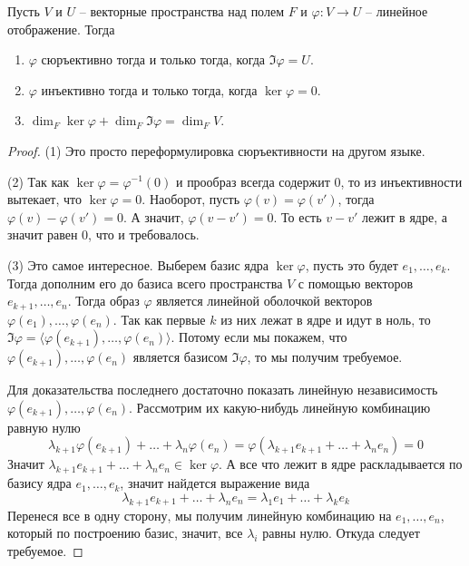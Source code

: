 \begin{claim}
\label{claim::ImKer}
Пусть $V$ и $U$ -- векторные пространства над полем $F$ и $\varphi \colon V\to U$ -- линейное отображение.
Тогда
\begin{enumerate}
\item $\varphi$ сюръективно тогда и только тогда, когда $\Im \varphi = U$.

\item $\varphi$ инъективно тогда и только тогда, когда $\ker \varphi = 0$.

\item $\dim_F \ker \varphi + \dim_F \Im \varphi = \dim_F V$.
\end{enumerate}
\end{claim}
\begin{proof}
(1) Это просто переформулировка сюръективности на другом языке.

(2) Так как $\ker \varphi = \varphi^{-1}(0)$ и прообраз всегда содержит $0$, то из инъективности вытекает, что $\ker \varphi = 0$.
Наоборот, пусть $\varphi (v) = \varphi(v')$, тогда $\varphi(v) - \varphi (v') = 0$.
А значит,  $\varphi(v - v') = 0$.
То есть $v - v'$ лежит в ядре, а значит равен $0$, что и требовалось.

(3) Это самое интересное.
Выберем базис ядра $\ker \varphi$, пусть это будет $e_1,\ldots, e_k$.
Тогда дополним его до базиса всего пространства $V$ с помощью векторов $e_{k+1}, \ldots, e_n$.
Тогда образ $\varphi$ является линейной оболочкой векторов $\varphi(e_1),\ldots, \varphi(e_n)$.
Так как первые $k$ из них лежат в ядре и идут в ноль, то $\Im \varphi = \langle \varphi(e_{k+1}), \ldots, \varphi(e_n)\rangle$.
Потому если мы покажем, что $\varphi(e_{k+1}), \ldots,\varphi(e_n)$ является базисом $\Im\varphi$, то мы получим требуемое.

Для доказательства последнего достаточно показать линейную независимость $\varphi(e_{k+1}),\ldots,\varphi(e_n)$.
Рассмотрим их какую-нибудь линейную комбинацию равную нулю
\[
\lambda_{k+1}\varphi(e_{k+1})+\ldots+\lambda_n\varphi(e_n) = \varphi(\lambda_{k+1}e_{k+1}+\ldots+\lambda_n e_n) = 0
\]
Значит $\lambda_{k+1}e_{k+1}+\ldots+\lambda_n e_n\in \ker \varphi$.
А все что лежит в ядре раскладывается по базису ядра $e_1,\ldots, e_k$, значит найдется выражение вида
\[
\lambda_{k+1}e_{k+1}+\ldots+\lambda_n e_n = \lambda_1 e_1 + \ldots + \lambda_k e_k
\] 
Перенеся все в одну сторону, мы получим линейную комбинацию на $e_1,\ldots,e_n$, который по построению базис, значит, все $\lambda_i$ равны нулю.
Откуда следует требуемое.
\end{proof}


